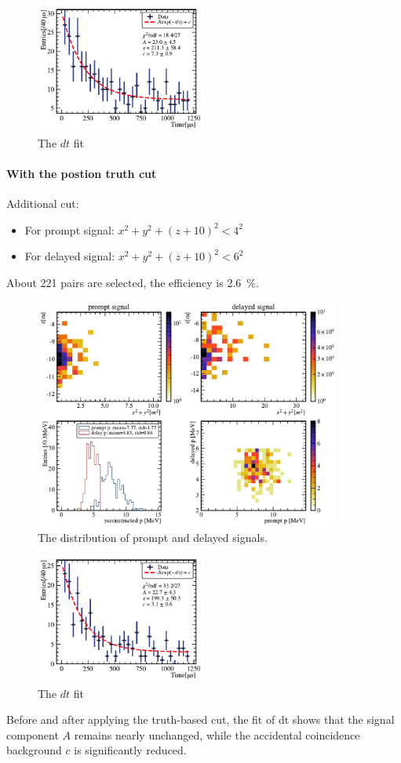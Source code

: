 \begin{figure}[!htbp]
	\centering
	\includegraphics[width=0.5\textwidth]{neutrontag/coin/3671_coin_fit.pdf}
	\caption{The $dt$ fit}
	\label{coin:dt0}
\end{figure}

\paragraph{With the postion truth cut}
Additional cut:
\begin{itemize}
	\item For prompt signal: $x^2+y^2+(z+10)^2<4^2$
	\item For delayed signal: $x^2+y^2+(z+10)^2<6^2$
\end{itemize}

About 221 pairs are selected, the efficiency is \SI{2.6}{\percent}.
\begin{figure}[!htbp]
	\centering
	\includegraphics[width=0.9\textwidth]{neutrontag/coin/3671_pos_coin.pdf}
	\caption{The distribution of prompt and delayed signals.}
	\label{coin:pos1}
\end{figure}

\begin{figure}[!htbp]
	\centering
	\includegraphics[width=0.5\textwidth]{neutrontag/coin/3671_coin_pos_fit.pdf}
	\caption{The $dt$ fit}
	\label{coin:dt1}
\end{figure}

Before and after applying the truth-based cut, the fit of dt shows that the signal component $A$ remains nearly unchanged, while the accidental coincidence background $c$ is significantly reduced.
